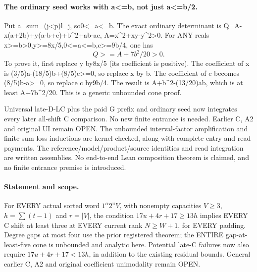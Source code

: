 \paragraph{The ordinary seed works with a<=b, not just a<=b/2.}
Put a=sum_(j<p)l_j, so0<=a<=b. The exact ordinary determinant is
Q=A-x(a+2b)+y(a-b+c)+b^2+ab-ac, A=x^2+xy-y^2>0.
For ANY reals x>=b>0,y>=8x/5,0<=a<=b,c>=9b/4, one has
\[
 Q>=A+7b^2/20>0.
\]
To prove it, first replace y by8x/5 (its coefficient is positive).
The coefficient of x is (3/5)a-(18/5)b+(8/5)c>=0,
so replace x by b. The coefficient of c becomes (8/5)b-a>=0,
so replace c by9b/4. The result is A+b^2-(13/20)ab,
which is at least A+7b^2/20. This is a generic unbounded cone proof.

Universal late-D-LC plus the paid G prefix and ordinary seed now
integrates every later all-shift C comparison. No new finite entrance
is needed. Earlier C, A2 and original UI remain OPEN. The unbounded interval-factor amplification and finite-sum loss
inductions are kernel checked, along with complete entry and read
payments. The reference/model/product/source identities and read
integration are written assemblies. No end-to-end Lean composition
theorem is claimed, and no finite entrance premise is introduced.

\paragraph{Statement and scope.}
For EVERY actual sorted word $1^\alpha2^uV$, with nonempty capacities
$V\ge3$, $h=\sum(t-1)$ and $r=|V|$, the condition
$17u+4r+17\ge13h$ implies EVERY C shift at least three at EVERY
current rank $N\ge W+1$, for EVERY padding. Degree gaps at most four
use the prior registered theorem; the ENTIRE gap-at-least-five cone
is unbounded and analytic here. Potential late-C failures now also
require $17u+4r+17<13h$, in addition to the existing residual bounds.
General earlier C, A2 and original coefficient unimodality remain OPEN.

